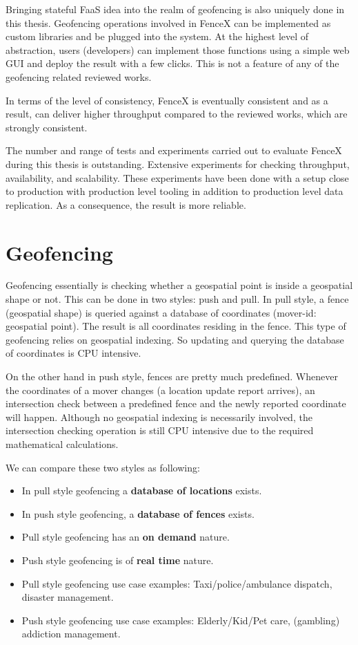 \documentclass[a4]{report}
\begin{document}
    Bringing stateful FaaS idea into the realm of geofencing is also uniquely done in this thesis.
    Geofencing operations involved in FenceX can be implemented as custom libraries and be plugged into the system.
    At the highest level of abstraction, users (developers) can implement those functions using a simple web GUI and deploy the result with a few clicks.
    This is not a feature of any of the geofencing related reviewed works.

    In terms of the level of consistency, FenceX is eventually consistent and as a result, can deliver higher throughput
    compared to the reviewed works, which are strongly consistent.

    The number and range of tests and experiments carried out to evaluate FenceX during this thesis is
    outstanding.
    Extensive experiments for checking throughput, availability, and scalability.
    These experiments have been done with a setup close to production with production level tooling in addition to production level data replication.
    As a consequence, the result is more reliable.


    \chapter{Geofencing}
    Geofencing essentially is checking whether a geospatial point is inside a geospatial shape or not.
    This can be done in two styles: push and pull.
    In pull style, a fence (geospatial shape) is queried against a database of coordinates (mover-id: geospatial point).
    The result is all coordinates residing in the fence.
    This type of geofencing relies on geospatial indexing.
    So updating and querying the database of coordinates is CPU intensive.

    On the other hand in push style, fences are pretty much predefined.
    Whenever the coordinates of a mover changes (a location update report arrives), an intersection check between a
    predefined fence and the newly reported coordinate will happen.
    Although no geospatial indexing is necessarily involved, the intersection checking operation is still CPU
    intensive due to the required mathematical calculations.

    We can compare these two styles as following:
    \begin{itemize}
        \item In pull style geofencing a \textbf{database of locations} exists.
        \item In push style geofencing, a \textbf{database of fences} exists.
        \item Pull style geofencing has an \textbf{on demand} nature.
        \item Push style geofencing is of \textbf{real time} nature.
        \item Pull style geofencing use case examples: Taxi/police/ambulance dispatch, disaster management.
        \item Push style geofencing use case examples: Elderly/Kid/Pet care, (gambling) addiction management.
    \end{itemize}
\end{document}

